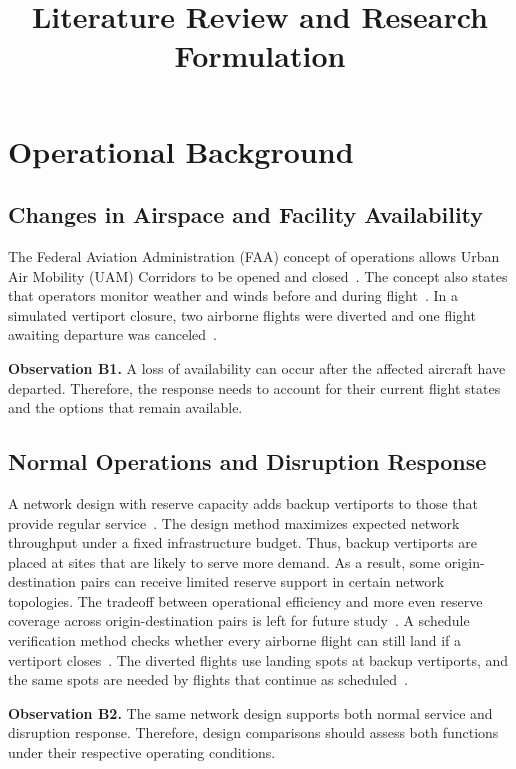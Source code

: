 \documentclass[11pt,letterpaper]{article}
\title{Literature Review and Research Formulation}
\author{}
\date{}
\newcommand{\observation}[2]{\par\noindent\textbf{Observation #1.} #2\par}
\begin{document}
\maketitle

\section{Operational Background}
\label{sec:operational-background}

\subsection{Changes in Airspace and Facility Availability}

The Federal Aviation Administration (FAA) concept of operations allows Urban Air Mobility (UAM) Corridors to be opened and closed~\cite{FAA2023_L088}. The concept also states that operators monitor weather and winds before and during flight~\cite{FAA2023_L088}. In a simulated vertiport closure, two airborne flights were diverted and one flight awaiting departure was canceled~\cite{Prince2025_L041}.

\observation{B1}{A loss of availability can occur after the affected aircraft have departed. Therefore, the response needs to account for their current flight states and the options that remain available.}

\subsection{Normal Operations and Disruption Response}

A network design with reserve capacity adds backup vertiports to those that provide regular service~\cite{Wei2024_L063}. The design method maximizes expected network throughput under a fixed infrastructure budget. Thus, backup vertiports are placed at sites that are likely to serve more demand. As a result, some origin-destination pairs can receive limited reserve support in certain network topologies. The tradeoff between operational efficiency and more even reserve coverage across origin-destination pairs is left for future study~\cite{Wei2024_L063}. A schedule verification method checks whether every airborne flight can still land if a vertiport closes~\cite{Wei2024_L069}. The diverted flights use landing spots at backup vertiports, and the same spots are needed by flights that continue as scheduled~\cite{Wei2024_L069}.

\observation{B2}{The same network design supports both normal service and disruption response. Therefore, design comparisons should assess both functions under their respective operating conditions.}
\end{document}

